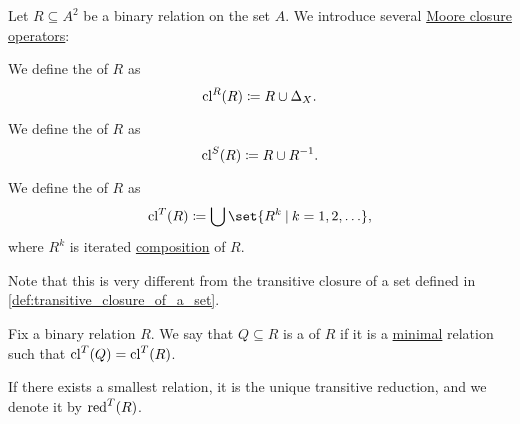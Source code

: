 \begin{definition}\label{def:relation_closures}
  Let \( R \subseteq A^2 \) be a binary relation on the set \( A \). We introduce several \hyperref[def:moore_closure_operator]{Moore closure operators}:
  \begin{thmenum}
     We define the  of \( R \) as
    \begin{equation*}
      \operatorname{cl}^R(R) \coloneqq R \cup \Delta_X.
    \end{equation*}

     We define the  of \( R \) as
    \begin{equation*}
      \operatorname{cl}^S(R) \coloneqq R \cup R^{-1}.
    \end{equation*}

     We define the  of \( R \) as
    \begin{equation*}
      \cl^T(R) \coloneqq \bigcup \set{ R^k \given k = 1, 2, \ldots },
    \end{equation*}
    where \( R^k \) is iterated \hyperref[def:binary_relation/composition]{composition} of \( R \).

    Note that this is very different from the transitive closure of a set defined in \cref{def:transitive_closure_of_a_set}.
  \end{thmenum}
\end{definition}

\begin{definition}\label{def:transitive_reduction}
  Fix a binary relation \( R \). We say that \( Q \subseteq R \) is a  of \( R \) if it is a \hyperref[def:extremal_points/maximal_and_minimal_element]{minimal} relation such that \( \operatorname{cl}^T(Q) = \operatorname{cl}^T(R) \).

  If there exists a smallest relation, it is the unique transitive reduction, and we denote it by \( \operatorname{red}^T(R) \).
\end{definition}

